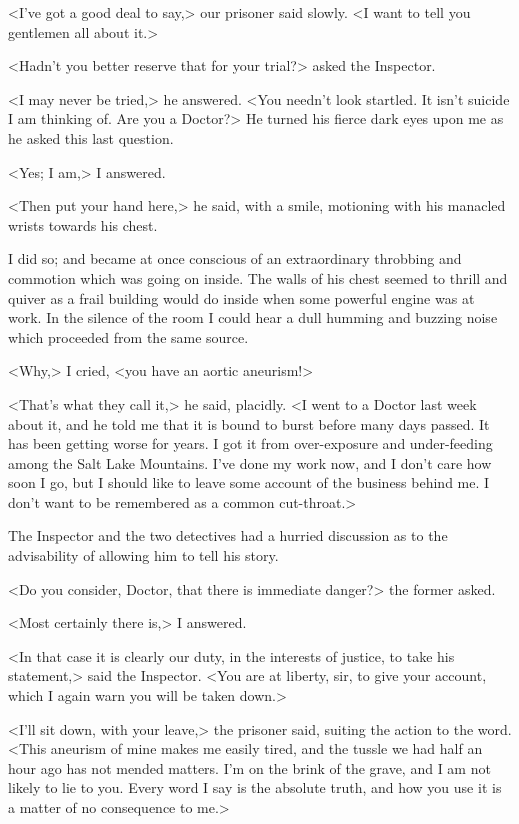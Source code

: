 <I've got a good deal to say,> our prisoner said slowly. <I want to tell you gentlemen all about it.>

<Hadn't you better reserve that for your trial?> asked the Inspector.

<I may never be tried,> he answered. <You needn't look startled. It isn't suicide I am thinking of. Are you a Doctor?> He turned his fierce dark eyes upon me as he asked this last question.

<Yes; I am,> I answered.

<Then put your hand here,> he said, with a smile, motioning with his manacled wrists towards his chest.

I did so; and became at once conscious of an extraordinary throbbing and commotion which was going on inside. The walls of his chest seemed to thrill and quiver as a frail building would do inside when some powerful engine was at work. In the silence of the room I could hear a dull humming and buzzing noise which proceeded from the same source.

<Why,> I cried, <you have an aortic aneurism!>

<That's what they call it,> he said, placidly. <I went to a Doctor last week about it, and he told me that it is bound to burst before many days passed. It has been getting worse for years. I got it from over-exposure and under-feeding among the Salt Lake Mountains. I've done my work now, and I don't care how soon I go, but I should like to leave some account of the business behind me. I don't want to be remembered as a common cut-throat.>

The Inspector and the two detectives had a hurried discussion as to the advisability of allowing him to tell his story.

<Do you consider, Doctor, that there is immediate danger?> the former asked.

<Most certainly there is,> I answered.

<In that case it is clearly our duty, in the interests of justice, to take his statement,> said the Inspector. <You are at liberty, sir, to give your account, which I again warn you will be taken down.>

<I'll sit down, with your leave,> the prisoner said, suiting the action to the word. <This aneurism of mine makes me easily tired, and the tussle we had half an hour ago has not mended matters. I'm on the brink of the grave, and I am not likely to lie to you. Every word I say is the absolute truth, and how you use it is a matter of no consequence to me.>

